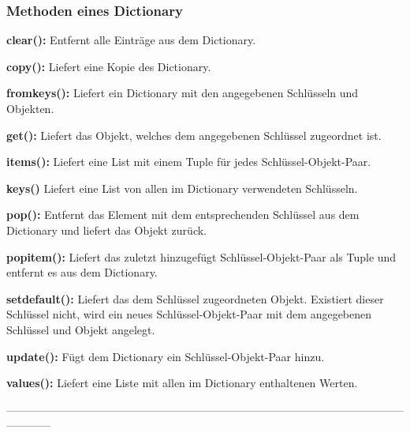 \subsubsection{Methoden eines Dictionary}
\textbf{clear():}
Entfernt alle Einträge aus dem Dictionary.


\textbf{copy():}
Liefert eine Kopie des Dictionary.


\textbf{fromkeys():}
Liefert ein Dictionary mit den angegebenen Schlüsseln und Objekten.


\textbf{get():}
Liefert das Objekt, welches dem angegebenen Schlüssel zugeordnet ist.


\textbf{items():}
Liefert eine List mit einem Tuple für jedes Schlüssel-Objekt-Paar.


\textbf{keys()}
Liefert eine List von allen im Dictionary verwendeten Schlüsseln.


\textbf{pop():}
Entfernt das Element mit dem entsprechenden Schlüssel aus dem Dictionary und liefert das Objekt zurück.


\textbf{popitem():}
Liefert das zuletzt hinzugefügt Schlüssel-Objekt-Paar als Tuple und entfernt es aus dem Dictionary.


\textbf{setdefault():}
Liefert das dem Schlüssel zugeordneten Objekt. Existiert dieser Schlüssel nicht, wird ein neues Schlüssel-Objekt-Paar mit dem angegebenen Schlüssel und Objekt angelegt.


\textbf{update():}
Fügt dem Dictionary ein Schlüssel-Objekt-Paar hinzu.


\textbf{values():}
Liefert eine Liste mit allen im Dictionary enthaltenen Werten.






------------------------------------------------------------------------------------------------------------------------
